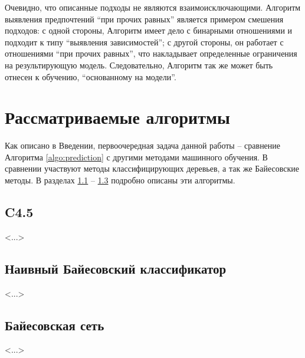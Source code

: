 	Очевидно, что описанные подходы не являются взаимоисключающими. Алгоритм выявления предпочтений \enquote{при прочих равных} является примером смешения подходов: с одной стороны, Алгоритм имеет дело с бинарными отношениями и подходит к типу ``выявления зависимостей''; с другой стороны, он работает с отношениями \enquote{при прочих равных}, что накладывает определенные ограничения на результирующую модель. Следовательно, Алгоритм так же может быть отнесен к обучению, ``основанному на модели''.

\section{Рассматриваемые алгоритмы}

	Как описано в Введении, первоочередная задача данной работы – сравнение Алгоритма \ref{algo:prediction} с другими методами машинного обучения. В сравнении участвуют методы классифицирующих деревьев, а так же Байесовские методы. В разделах \ref{subsec:c4.5} -- \ref{subsec:bayes_net} подробно описаны эти алгоритмы.
	
	\subsection{C4.5}
	\label{subsec:c4.5}
	<...>
	
	\subsection{Наивный Байесовский классификатор}
	\label{subsec:naive_bayes}
	<...>
	
	\subsection{Байесовская сеть}
	\label{subsec:bayes_net}
	<...>